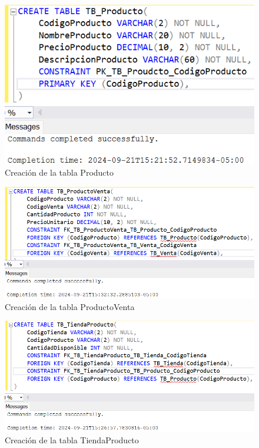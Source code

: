 \begin{figure}[H]
  \centering
  \includegraphics[scale = 0.7]{Imagenes/sql/2.crear_tablas/creacion_tabla_producto.png}
  \caption{Creación de la tabla Producto}
\end{figure}

\begin{figure}[H]
  \centering
  \includegraphics[scale = 0.7]{Imagenes/sql/2.crear_tablas/creacion_tabla_productoventa.png}
  \caption{Creación de la tabla ProductoVenta}
\end{figure}

\begin{figure}[H]
  \centering
  \includegraphics[scale = 0.7]{Imagenes/sql/2.crear_tablas/creacion_tabla_tiendaproducto.png}
  \caption{Creación de la tabla TiendaProducto}
\end{figure}

